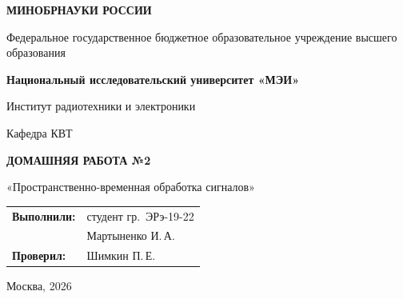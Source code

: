 \begin{titlepage}
    \centering
    {\bfseries МИНОБРНАУКИ РОССИИ\par}
    Федеральное государственное бюджетное образовательное учреждение высшего образования \\
    {\bfseries Национальный исследовательский университет «МЭИ»\par}
    \vspace{1cm}
    Институт радиотехники и электроники\par
    Кафедра КВТ\par
    \vspace{3cm}
    
    {\bfseries\large ДОМАШНЯЯ РАБОТА №2\par}
    \vspace{0.5cm}
    {\large «Пространственно-временная обработка сигналов»\par}
    
    \vspace{3.5cm}
 \vspace{1.5cm}
\noindent\hfill
\begin{tabular}{@{}ll@{}}
    \textbf{Выполнили:} & студент гр.~ЭРэ-19-22 \\
                        & Мартыненко И.\,А. \\
    \textbf{Проверил:}  & Шимкин П.\,Е.
\end{tabular}   
    \vfill
    {Москва, 2026}
\end{titlepage}
